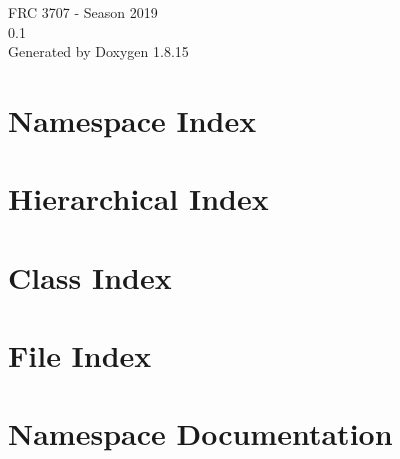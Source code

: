 \let\mypdfximage\pdfximage\def\pdfximage{\immediate\mypdfximage}\documentclass[twoside]{book}
\newcommand{\+}{\discretionary{\mbox{\scriptsize$\hookleftarrow$}}{}{}}
\newcommand{\clearemptydoublepage}{%
  \newpage{\pagestyle{empty}\cleardoublepage}%
}
\begin{document}
\hypersetup{pageanchor=false,
             bookmarksnumbered=true,
             pdfencoding=unicode
            }
\begin{titlepage}
\vspace*{7cm}
\begin{center}%
{\Large F\+RC 3707 -\/ Season 2019 \\[1ex]\large 0.\+1 }\\
\vspace*{1cm}
{\large Generated by Doxygen 1.8.15}\\
\end{center}
\end{titlepage}
\clearemptydoublepage
{}
\tableofcontents
\clearemptydoublepage
{}
\hypersetup{pageanchor=true}

\chapter{Namespace Index}

\chapter{Hierarchical Index}

\chapter{Class Index}

\chapter{File Index}

\chapter{Namespace Documentation}










\end{document}
